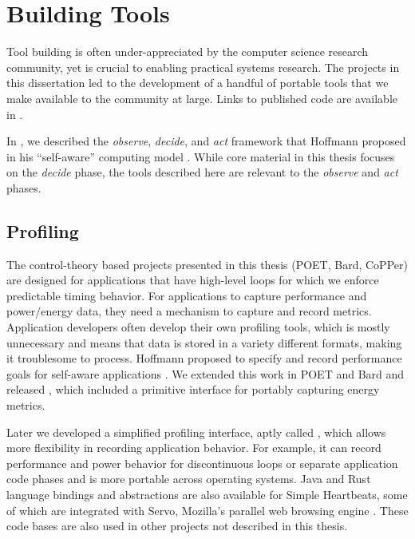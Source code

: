 \chapter{Building Tools}
\label{app:tools}

Tool building is often under-appreciated by the computer science research community, yet is crucial to enabling practical systems research.
The projects in this dissertation led to the development of a handful of portable tools that we make available to the community at large.
Links to published code are available in .

In , we described the \emph{observe}, \emph{decide}, and \emph{act} framework that Hoffmann proposed in his ``self-aware'' computing model \cite{HoffmannPhD}.
While core material in this thesis focuses on the \emph{decide} phase, the tools described here are relevant to the \emph{observe} and \emph{act} phases.


\section{Profiling}
\label{app:profiling}

The control-theory based projects presented in this thesis (POET, Bard, CoPPer) are designed for applications that have high-level loops for which we enforce predictable timing behavior.
For applications to capture performance and power/energy data, they need a mechanism to capture and record metrics.
Application developers often develop their own profiling tools, which is mostly unnecessary and means that data is stored in a variety different formats, making it troublesome to process.
Hoffmann \etal proposed  to specify and record performance goals for self-aware applications \cite{icac2010heartbeats}.
We extended this work in POET and Bard and released , which included a primitive interface for portably capturing energy metrics.

Later we developed a simplified profiling interface, aptly called , which allows more flexibility in recording application behavior.
For example, it can record performance and power behavior for discontinuous loops or separate application code phases and is more portable across operating systems.
Java and Rust language bindings and abstractions are also available for Simple Heartbeats, some of which are integrated with Servo, Mozilla's parallel web browsing engine \cite{servo}.
These code bases are also used in other projects not described in this thesis.

